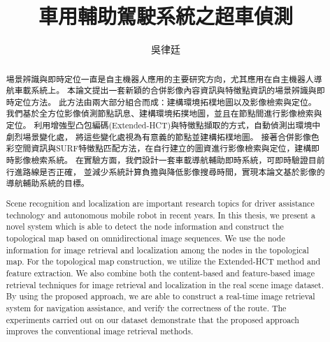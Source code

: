 \documentclass[12pt,a4paper]{report}
\author{吳律廷}
\title{車用輔助駕駛系統之超車偵測}
\begin{document}
\setlength{\baselineskip}{24pt} %
\pagestyle{prelim} %


\begin{abstract}
場景辨識與即時定位一直是自主機器人應用的主要研究方向，尤其應用在自主機器人導航車載系統上。
本論文提出一套新穎的合併影像內容資訊與特徵點資訊的場景辨識與即時定位方法。
此方法由兩大部分組合而成：建構環境拓樸地圖以及影像檢索與定位。
我們基於全方位影像偵測節點訊息、建構環境拓撲地圖，並且在節點間進行影像檢索與定位。
利用增強型凸包編碼(Extended-HCT)與特徵點擷取的方式，自動偵測出環境中劇烈場景變化處，
將這些變化處視為有意義的節點並建構拓樸地圖。
接著合併影像色彩空間資訊與SURF特徵點匹配方法，在自行建立的圖資進行影像檢索與定位，建構即時影像檢索系統。
在實驗方面，我們設計一套車載導航輔助即時系統，可即時驗證目前行進路線是否正確，
並減少系統計算負擔與降低影像搜尋時間，實現本論文基於影像的導航輔助系統的目標。


\end{abstract}

\begin{abstract}
Scene recognition and localization are important research topics for driver assistance technology and autonomous mobile robot in recent years.
In this thesis, we present a novel system which is able to detect the node information and construct the topological map based on omnidirectional image sequences. 
We use the node information for image retrieval and localization among the nodes in the topological map. 
For the topological map construction, we utilize the Extended-HCT method and feature extraction. 
We also combine both the content-based and feature-based image retrieval techniques for image retrieval and localization in the real scene image dataset. 
By using the proposed approach, we are able to construct a real-time image retrieval system for navigation assistance, and verify the correctness of the route. 
The experiments carried out on our dataset demonstrate that the proposed approach improves the conventional image retrieval methods.
\end{abstract}
\end{document}
